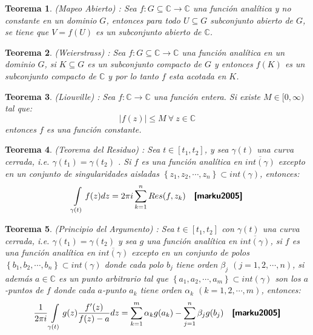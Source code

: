 \documentclass[spanish, openright,oneside]{book}
\newtheorem{teo}{Teorema}[chapter]
\theoremstyle{definition}
\begin{document}
\begin{teo}\label{mapAb}{(Mapeo Abierto)} :
Sea $f:G\subseteq\mathbb{C}\rightarrow \mathbb{C}$ una función analítica y no constante en un dominio $G$, entonces para todo $U\subseteq G$ subconjunto abierto de $G$, se tiene que $V=f(U)$ es un subconjunto abierto de $\mathbb{C}$. \ \ \ \textbf{\textsf{\cite{marsd1996}}}  
\end{teo}

\begin{teo}\label{teoMinMax}{(Weierstrass)} :
Sea $f:G\subseteq\mathbb{C}\rightarrow \mathbb{C}$ una función analítica en un dominio $G$, si $K\subseteq G$ es un subconjunto compacto de $G$ y entonces $f(K)$ es un subconjunto compacto de $\mathbb{C}$ y por lo tanto $f$ esta acotada en $K$.\ \ \ \textbf{\textsf{\cite{marsd1996}}}  
\end{teo}

\begin{teo}\label{teoLiou}{(Liouville)} :
Sea $f:\mathbb{C}\rightarrow \mathbb{C}$ una función entera. Si existe $M\in [0,\infty)$ tal que:
\[
|f(z)|\leq M \ \forall \ z \in \mathbb{C}
\]
entonces $f$ es una función constante.\ \ \ \textbf{\textsf{\cite{marsd1996}}}  
\end{teo}

\begin{teo}\label{teoRes}{(Teorema del Residuo)} :
Sea $t\in [t_1,t_2]$, y sea $\gamma(t)$ una curva cerrada, i.e. $\gamma(t_1)=\gamma(t_2)$ . Si $f$ es una función analítica en $\overline{int(\gamma)}$ excepto en un conjunto de singularidades aisladas  $\left\{ z_1,z_2,\cdots, z_n \right\} \subset int(\gamma) $, entonces:
\[
\int\limits_{\gamma(t)}f(z)dz=2\pi i \sum\limits_{k=1}^{n} Res(f,z_k)\ \ \ \textbf{\textsf{\cite{marku2005}}}  
\]

\end{teo}

\begin{teo}\label{PrinArg}{(Principio del Argumento)} :
Sea $t\in [t_1,t_2]$ con $\gamma(t)$ una curva cerrada, i.e. $\gamma(t_1)=\gamma(t_2)$ y sea $g$ una función analítica en $\overline{int(\gamma)}$, si $f$ es una función analítica en $\overline{int(\gamma)}$ excepto en un conjunto de polos $\left\{ b_1,b_2,\cdots, b_n \right\} \subset int(\gamma)$ donde cada polo $b_j$ tiene orden $\beta_j$ $(j=1,2,\cdots ,n)$, si además $a\in \mathbb{C}$ es un punto arbitrario tal que $\left\{ a_1,a_2,\cdots, a_m \right\} \subset int(\gamma) $ son los $a$-puntos de $f$ donde cada $a$-punto $a_k$ tiene orden $\alpha_k$ $(k=1,2,\cdots ,m)$, entonces:
\[
\frac{1}{2\pi i}\int\limits_{\gamma(t)}g(z)\frac{f'(z)}{f(z)-a} dz= \sum\limits_{k=1}^{m} \alpha_k g(a_k) - \sum\limits_{j=1}^{n} \beta_j g(b_j) \ \ \ \textbf{\textsf{\cite{marku2005}}}  
\]

\end{teo}
\end{document}
